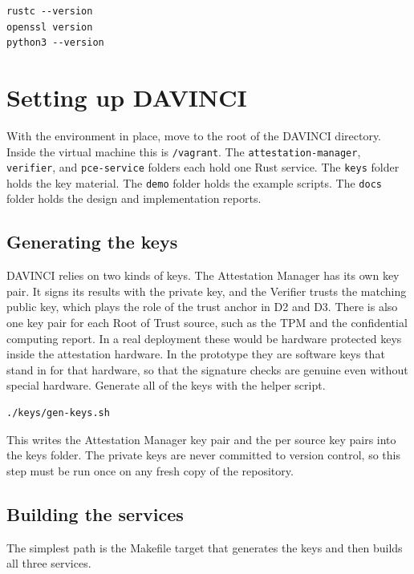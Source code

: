\documentclass[11pt,a4paper]{article}
\begin{document}
\begin{lstlisting}
rustc --version
openssl version
python3 --version
\end{lstlisting}

\section{Setting up DAVINCI}

With the environment in place, move to the root of the DAVINCI directory. Inside
the virtual machine this is \texttt{/vagrant}. The \texttt{attestation-manager},
\texttt{verifier}, and \texttt{pce-service} folders each hold one Rust service.
The \texttt{keys} folder holds the key material. The \texttt{demo} folder holds
the example scripts. The \texttt{docs} folder holds the design and implementation
reports.

\subsection{Generating the keys}

DAVINCI relies on two kinds of keys. The Attestation Manager has its own key
pair. It signs its results with the private key, and the Verifier trusts the
matching public key, which plays the role of the trust anchor in D2 and D3. There
is also one key pair for each Root of Trust source, such as the TPM and the
confidential computing report. In a real deployment these would be hardware
protected keys inside the attestation hardware. In the prototype they are
software keys that stand in for that hardware, so that the signature checks are
genuine even without special hardware. Generate all of the keys with the helper
script.

\begin{lstlisting}
./keys/gen-keys.sh
\end{lstlisting}

This writes the Attestation Manager key pair and the per source key pairs into
the keys folder. The private keys are never committed to version control, so this
step must be run once on any fresh copy of the repository.

\subsection{Building the services}

The simplest path is the Makefile target that generates the keys and then builds
all three services.
\end{document}
